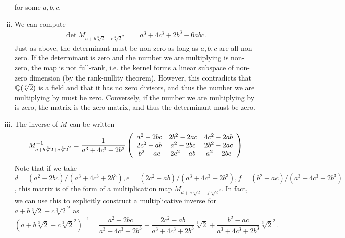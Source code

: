 \documentclass{../../mathnotes}
\begin{document}
\begin{enumerate}[(i)]
        for some $a,b,c$.
    \item We can compute
        \begin{align*}
            \det M_{a+b\sqrt[3]{2}+c\sqrt[3]{2}^2}&=a^3+4c^3+2b^3-6abc.
        \end{align*}
        Just as above, the determinant must be non-zero as long as $a,b,c$ are all non-zero.
        If the determinant is zero and the number we are multiplying is non-zero, the map is not full-rank, i.e. the kernel forms a linear subspace
        of non-zero dimension (by the rank-nullity theorem). However, this contradicts that $\mathbb{Q}(\sqrt[3]{2})$ is a field and that
        it has no zero divisors, and thus the number we are multiplying by must be zero. Conversely, if the number we are
        multiplying by is zero, the matrix is the zero matrix, and thus the determinant must be zero.
    \item The inverse of $M$ can be written
        \begin{align*}
            M^{-1}_{a+b\sqrt[3]{2}+c\sqrt[3]{2}^2}=\frac{1}{a^3+4c^3+2b^3}
            \left( 
            \begin{array}[]{ccc}
                a^2-2bc & 2b^2-2ac & 4c^2-2ab\\
                2c^2-ab & a^2-2bc & 2b^2-2ac\\
                b^2-ac & 2c^2-ab & a^2-2bc
            \end{array}
            \right)
        \end{align*}
        Note that if we take $d=(a^2-2bc)/(a^3+4c^3+2b^3),e=(2c^2-ab)/(a^3+4c^3+2b^3),f=(b^2-ac)/(a^3+4c^3+2b^3)$,
        this matrix is of the form of a multiplication map $M_{d+e\sqrt[3]{2}+f\sqrt[3]{2}^2}$. In fact, we can use this 
        to explicitly construct a multiplicative inverse for $a+b\sqrt[3]{2}+c\sqrt[3]{2}^2$ as
        \[(a+b\sqrt[3]{2}+c\sqrt[3]{2}^2)^{-1}=\frac{a^2-2bc}{a^3+4c^3+2b^3}+\frac{2c^2-ab}{a^3+4c^3+2b^3}\sqrt[3]{2}+\frac{b^2-ac}{a^3+4c^3+2b^3}\sqrt[3]{2}^2.\]
\end{enumerate}
\end{document}
